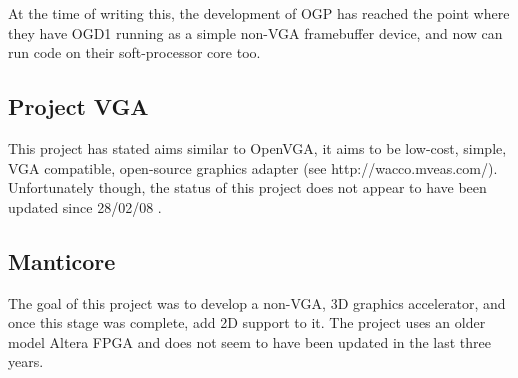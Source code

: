 At the time of writing this, the development of OGP has reached the point where
they have OGD1 running as a simple non-VGA framebuffer device, and now can run
code on their soft-processor core too.


\subsection{Project VGA}


This project has stated aims similar to OpenVGA, it aims to be low-cost, simple,
VGA compatible, open-source graphics adapter (see http://wacco.mveas.com/).
Unfortunately though, the status of this project does not appear to have been
updated since 28/02/08 .


\subsection{Manticore}
The goal of this project was to develop a non-VGA, 3D graphics accelerator, and
once this stage was complete, add 2D support to it. The project uses an older model
Altera FPGA and does not seem to have been updated in the last three years.
